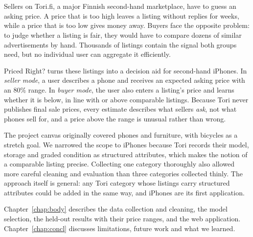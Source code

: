 \chapter{\introtitle}
\label{chap:intro}

Sellers on Tori.fi, a major Finnish second-hand marketplace, have to guess an asking price. A price that is too high leaves a listing without replies for weeks, while a price that is too low gives money away. Buyers face the opposite problem: to judge whether a listing is fair, they would have to compare dozens of similar advertisements by hand. Thousands of listings contain the signal both groups need, but no individual user can aggregate it efficiently.

Priced Right? turns these listings into a decision aid for second-hand iPhones. In \emph{seller mode}, a user describes a phone and receives an expected asking price with an 80\% range. In \emph{buyer mode}, the user also enters a listing's price and learns whether it is below, in line with or above comparable listings. Because Tori never publishes final sale prices, every estimate describes what sellers \emph{ask}, not what phones sell for, and a price above the range is unusual rather than wrong.

The project canvas originally covered phones and furniture, with bicycles as a stretch goal. We narrowed the scope to iPhones because Tori records their model, storage and graded condition as structured attributes, which makes the notion of a comparable listing precise. Collecting one category thoroughly also allowed more careful cleaning and evaluation than three categories collected thinly. The approach itself is general: any Tori category whose listings carry structured attributes could be added in the same way, and iPhones are its first application.

Chapter~\ref{chap:body} describes the data collection and cleaning, the model selection, the held-out results with their price ranges, and the web application. Chapter~\ref{chap:concl} discusses limitations, future work and what we learned.
